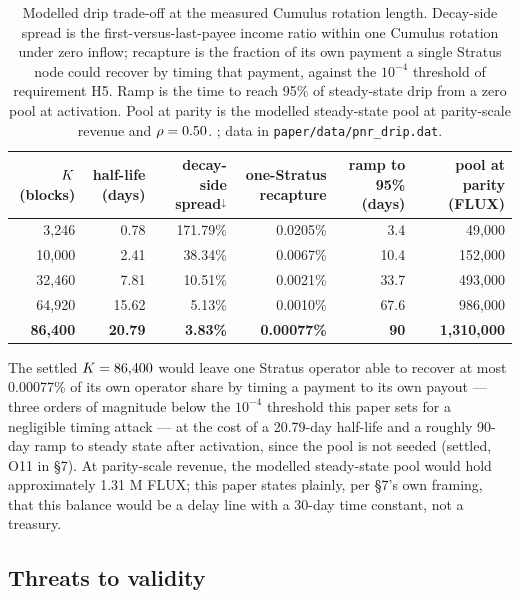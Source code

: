 \begin{table}[H]
\centering
\small
\begin{tabular}{rrrrrr}
\toprule
$K$ (blocks) & half-life (days) & decay-side spread$^{\downarrow}$ & one-Stratus recapture & ramp to 95\% (days) & pool at parity (FLUX) \\
\midrule
3,246 & 0.78 & 171.79\% & 0.0205\% & 3.4 & 49,000 \\
10,000 & 2.41 & 38.34\% & 0.0067\% & 10.4 & 152,000 \\
32,460 & 7.81 & 10.51\% & 0.0021\% & 33.7 & 493,000 \\
64,920 & 15.62 & 5.13\% & 0.0010\% & 67.6 & 986,000 \\
\textbf{86,400} & \textbf{20.79} & \textbf{3.83\%} & \textbf{0.00077\%} & \textbf{90} & \textbf{1,310,000} \\
\bottomrule
\end{tabular}
\caption{Modelled drip trade-off at the measured Cumulus rotation length. Decay-side spread is the
first-versus-last-payee income ratio within one Cumulus rotation under zero inflow; recapture is
the fraction of its own \PNR payment a single Stratus node could recover by timing that payment,
against the $10^{-4}$ threshold of requirement H5. Ramp is the time to reach 95\% of steady-state
drip from a zero pool at activation. Pool at parity is the modelled steady-state pool at
parity-scale revenue and $\rho = 0.50$. ;
data in \texttt{paper/\allowbreak{}data/\allowbreak{}pnr\_drip.\allowbreak{}dat}.}
\label{tab:eval-drip}
\end{table}

The settled $K = 86{,}400$ would leave one Stratus operator able to recover at most
0.00077\% of its own operator share by timing a payment to its own payout — three orders of
magnitude below the $10^{-4}$ threshold this paper sets for a negligible timing attack — at the
cost of a 20.79-day half-life and a roughly 90-day ramp to steady state after activation, since the
pool is not seeded (settled, O11 in \S7). At parity-scale revenue, the modelled steady-state
pool would hold approximately 1.31 M FLUX; this paper states plainly, per \S7's own framing, that
this balance would be a delay line with a 30-day time constant, not a treasury.

\subsection{Threats to validity}
\label{sec:eval-threats}

